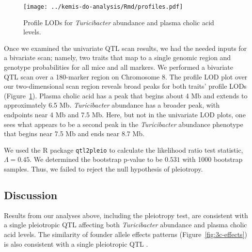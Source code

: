 \documentclass[oneside]{book}\usepackage[]{graphicx}\usepackage[]{color}
\begin{document}

\begin{figure}
\texttt{[image: ../kemis-do-analysis/Rmd/profiles.pdf]}
\caption{Profile LODs for \emph{Turicibacter} abundance and plasma cholic acid levels.}\label{fig:3c-profile}
\end{figure}

Once we examined the univariate QTL scan results, 
we had the needed inputs for a bivariate scan; namely, two traits that map to a single 
genomic region and genotype probabilities for all mice and all markers. 
We performed a bivariate QTL scan over a 180-marker region on Chromosome 8. 
The profile LOD plot over our two-dimensional scan region reveals broad peaks
for both traits' profile LODs (Figure~\ref{fig:3c-profile}). Plasma 
cholic acid has a peak that begins about 4 Mb and extends to 
approximately 6.5 Mb. \emph{Turicibacter} abundance has a broader peak, 
with endpoints near 4 Mb and 7.5 Mb. Here, but not in the univariate 
LOD plots, one sees what appears to be a second peak in the \emph{Turicibacter} 
abundance phenotype that begins near 7.5 Mb and ends near 8.7 Mb. 



We used the R package \texttt{qtl2pleio} \citep{qtl2pleio} to 
calculate the likelihood ratio test statistic, $\Lambda = 0.45$. We 
determined the bootstrap p-value to be $0.531$ with 1000 bootstrap 
samples. Thus, we failed to reject the null hypothesis of pleiotropy.


\subsection{Discussion}

Results from our analyses above, including the pleiotropy test, are consistent with a 
single pleiotropic QTL affecting both \emph{Turicibacter} abundance 
and plasma cholic acid levels. 
The similarity of founder allele effects patterns (Figure~\ref{fig:3c-effects}) is 
also consistent with a single pleiotropic QTL \citep{king2012genetic,macdonald2007joint}. 
\end{document}
